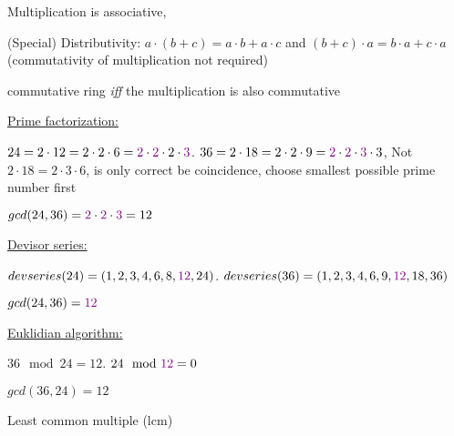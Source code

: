 \documentclass[landscape, a4paper]{article}
\begin{document}
\begin{minipage}[t]{0.2\linewidth}
\begin{betterlist}
\begin{betterlist}
\begin{betterlist}
\begin{betterlist}
\begin{betterlist}
						\item \alert{Multiplication} is \alert{associative},
						\item \alert{(Special) Distributivity}: $a \cdot (b + c) = a \cdot b + a \cdot c$ and $(b + c)\cdot a = b \cdot a + c\cdot  a$ (commutativity of multiplication not required)
					\end{betterlist}
					\item \alert{commutative ring} \textit{iff} the multiplication is also commutative
				\end{betterlist}
			\end{betterlist}
		\end{betterlist}
		\begin{betterlist}
			\item \underline{Prime factorization:}
			\begin{betterlist}
				\item $24 = 2\cdot 12 = 2\cdot 2\cdot 6 = \textcolor{PrimaryColor}{2}\cdot \textcolor{PrimaryColor}{2}\cdot 2\cdot \textcolor{PrimaryColor}{3}$. $36 = 2\cdot 18 = 2\cdot 2\cdot 9 = \textcolor{PrimaryColor}{2}\cdot \textcolor{PrimaryColor}{2}\cdot \textcolor{PrimaryColor}{3}\cdot 3$, Not $2\cdot 18 = 2 \cdot 3\cdot 6$, is only correct be coincidence, choose smallest possible prime number first
				\item $gcd(24, 36) = \textcolor{PrimaryColor}{2}\cdot \textcolor{PrimaryColor}{2}\cdot \textcolor{PrimaryColor}{3} = 12$
			\end{betterlist}
			\item \underline{Devisor series:}
			\begin{betterlist}
				\item $devseries(24) = (1, 2, 3, 4, 6, 8, \textcolor{PrimaryColor}{12}, 24)$. $devseries(36) = (1, 2, 3, 4, 6, 9, \textcolor{PrimaryColor}{12}, 18, 36)$
				\item $gcd(24, 36) = \textcolor{PrimaryColor}{12}$
			\end{betterlist}
			\item \underline{Euklidian algorithm:}
			\begin{betterlist}
				\item $36\mod 24 = 12$. $24\mod \textcolor{PrimaryColor}{12} = 0$
				\item $gcd(36,24) = 12$
			\end{betterlist}
			\item \alert{Least common multiple (lcm)}
			\begin{betterlist}

\end{betterlist}
\end{betterlist}
\end{betterlist}
\end{minipage}
\end{document}
